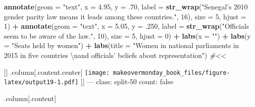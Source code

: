 \documentclass[]{book}
\newenvironment{Shaded}{\begin{snugshade}}{\end{snugshade}}
\newcommand{\KeywordTok}[1]{\textcolor[rgb]{0.13,0.29,0.53}{\textbf{#1}}}
\newcommand{\DataTypeTok}[1]{\textcolor[rgb]{0.13,0.29,0.53}{#1}}
\newcommand{\DecValTok}[1]{\textcolor[rgb]{0.00,0.00,0.81}{#1}}
\newcommand{\FloatTok}[1]{\textcolor[rgb]{0.00,0.00,0.81}{#1}}
\newcommand{\CharTok}[1]{\textcolor[rgb]{0.31,0.60,0.02}{#1}}
\newcommand{\StringTok}[1]{\textcolor[rgb]{0.31,0.60,0.02}{#1}}
\newcommand{\CommentTok}[1]{\textcolor[rgb]{0.56,0.35,0.01}{\textit{#1}}}
\newcommand{\OperatorTok}[1]{\textcolor[rgb]{0.81,0.36,0.00}{\textbf{#1}}}
\newcommand{\NormalTok}[1]{#1}
\theoremstyle{definition}
\theoremstyle{definition}
\theoremstyle{definition}
\theoremstyle{remark}
\begin{document}
\begin{Shaded}
\begin{Highlighting}[]
\StringTok{  }\KeywordTok{annotate}\NormalTok{(}\DataTypeTok{geom =} \StringTok{"text"}\NormalTok{, }\DataTypeTok{x =} \FloatTok{4.95}\NormalTok{, }\DataTypeTok{y =}\NormalTok{ .}\DecValTok{70}\NormalTok{, }\DataTypeTok{label =} \KeywordTok{str_wrap}\NormalTok{(}\StringTok{"Senegal's 2010 gender parity law means it leads among these countries."}\NormalTok{, }\DecValTok{16}\NormalTok{), }\DataTypeTok{size =} \DecValTok{5}\NormalTok{, }\DataTypeTok{hjust =} \DecValTok{1}\NormalTok{) }\OperatorTok{+}
\StringTok{  }\KeywordTok{annotate}\NormalTok{(}\DataTypeTok{geom =} \StringTok{"text"}\NormalTok{, }\DataTypeTok{x =} \FloatTok{5.05}\NormalTok{, }\DataTypeTok{y =}\NormalTok{ .}\DecValTok{250}\NormalTok{, }\DataTypeTok{label =} \KeywordTok{str_wrap}\NormalTok{(}\StringTok{"Officials seem to be aware of the law."}\NormalTok{, }\DecValTok{10}\NormalTok{), }\DataTypeTok{size =} \DecValTok{5}\NormalTok{, }\DataTypeTok{hjust =} \DecValTok{0}\NormalTok{) }\OperatorTok{+}
\StringTok{  }\KeywordTok{labs}\NormalTok{(}\DataTypeTok{x =} \StringTok{""}\NormalTok{) }\OperatorTok{+}
\StringTok{  }\KeywordTok{labs}\NormalTok{(}\DataTypeTok{y =} \StringTok{"Seats held by women"}\NormalTok{) }\OperatorTok{+}
\StringTok{  }\KeywordTok{labs}\NormalTok{(}\DataTypeTok{title =} \StringTok{"Women in national parliaments in 2015 in five countries }\CharTok{\textbackslash{}n}\StringTok{and officials' beliefs about representation"}\NormalTok{)  }\CommentTok{#<<}
\end{Highlighting}
\end{Shaded}

{]}{]} .column{[}.content.center{[}
\texttt{[image: makeovermonday\_book\_files/figure-latex/output19-1.pdf]}
{]}{]} --- class: split-50 count: false

.column{[}.content{[}
\end{document}
